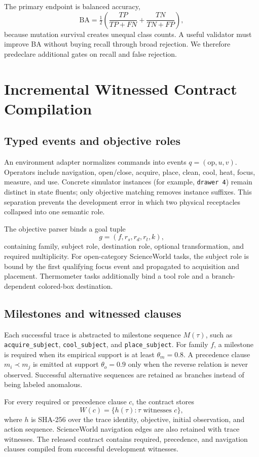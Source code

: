 \documentclass[10pt]{article}
\begin{document}
The primary endpoint is balanced accuracy,
\[
\mathrm{BA}=\tfrac12\left(\frac{TP}{TP+FN}+\frac{TN}{TN+FP}\right),
\]
because mutation survival creates unequal class counts. A useful validator must improve BA without buying recall through broad rejection. We therefore predeclare additional gates on recall and false rejection.

\section{Incremental Witnessed Contract Compilation}
\subsection{Typed events and objective roles}
An environment adapter normalizes commands into events $q=(\mathrm{op},u,v)$. Operators include navigation, open/close, acquire, place, clean, cool, heat, focus, measure, and use. Concrete simulator instances (for example, \texttt{drawer 4}) remain distinct in state fluents; only objective matching removes instance suffixes. This separation prevents the development error in which two physical receptacles collapsed into one semantic role.

The objective parser binds a goal tuple
\[
g=(f,r_s,r_d,r_t,k),
\]
containing family, subject role, destination role, optional transformation, and required multiplicity. For open-category ScienceWorld tasks, the subject role is bound by the first qualifying focus event and propagated to acquisition and placement. Thermometer tasks additionally bind a tool role and a branch-dependent colored-box destination.

\subsection{Milestones and witnessed clauses}
Each successful trace is abstracted to milestone sequence $M(\tau)$, such as \texttt{acquire\_subject}, \texttt{cool\_subject}, and \texttt{place\_subject}. For family $f$, a milestone is required when its empirical support is at least $\theta_m=0.8$. A precedence clause $m_i\prec m_j$ is emitted at support $\theta_o=0.9$ only when the reverse relation is never observed. Successful alternative sequences are retained as branches instead of being labeled anomalous.

For every required or precedence clause $c$, the contract stores
\[
W(c)=\{h(\tau):\tau\text{ witnesses }c\},
\]
where $h$ is SHA-256 over the trace identity, objective, initial observation, and action sequence. ScienceWorld navigation edges are also retained with trace witnesses. The released contract contains \ClauseCount{} required, precedence, and navigation clauses compiled from \TraceCount{} successful development witnesses.
\end{document}
